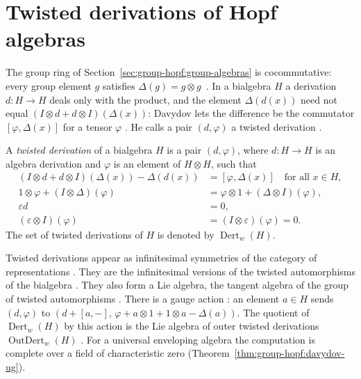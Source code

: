 \section{Twisted derivations of Hopf algebras}\label{sec:group-hopf:hopf}

The group ring of Section~\ref{sec:group-hopf:group-algebras} is
cocommutative: every group element $g$ satisfies $\Delta(g)=g\otimes g$~\cite[p.~572]{Davydov2013}. In a
bialgebra $H$ a derivation $d\colon H\to H$ deals only with the product, and
the element $\Delta(d(x))$ need not equal $(I\otimes d+d\otimes
I)(\Delta(x))$: Davydov lets the difference be the commutator
$[\varphi,\Delta(x)]$ for a tensor $\varphi$ \cite[p.~572]{Davydov2013}. He
calls a pair $(d,\varphi)$ a twisted derivation \cite[p.~572]{Davydov2013}.

\begin{definition}\label{def:group-hopf:twisted}
A \emph{twisted derivation} of a bialgebra $H$ is a pair $(d,\varphi)$, where
$d\colon H\to H$ is an algebra derivation and $\varphi$ is an element of
$H\otimes H$, such that
\begin{align*}
(I\otimes d+d\otimes I)(\Delta(x))-\Delta(d(x))&=[\varphi,\Delta(x)] \quad
\text{for all } x\in H,\\
1\otimes\varphi+(I\otimes\Delta)(\varphi)&=\varphi\otimes1+(\Delta\otimes I)(\varphi),\\
\varepsilon d&=0,\\
(\varepsilon\otimes I)(\varphi)&=(I\otimes\varepsilon)(\varphi)=0.
\end{align*}
The set of twisted derivations of $H$ is denoted by $\operatorname{Dert}_w(H)$.
\end{definition}

Twisted derivations appear as infinitesimal symmetries of the category of
representations \cite[p.~567]{Davydov2013}. They are the infinitesimal
versions of the twisted automorphisms of the bialgebra
\cite[p.~567]{Davydov2013}. They also form a Lie algebra, the tangent algebra
of the group of twisted automorphisms \cite[p.~567]{Davydov2013}. There is a
gauge action \cite[pp.~567--568]{Davydov2013}: an element $a\in H$ sends
$(d,\varphi)$ to $(d+[a,-],\,\varphi+a\otimes1+1\otimes a-\Delta(a))$. The
quotient of $\operatorname{Dert}_w(H)$ by this action is the Lie algebra of
outer twisted derivations $\operatorname{OutDert}_w(H)$
\cite[pp.~567--568]{Davydov2013}. For a universal enveloping algebra the
computation is complete over a field of characteristic zero
(Theorem~\ref{thm:group-hopf:davydov-ug}).

